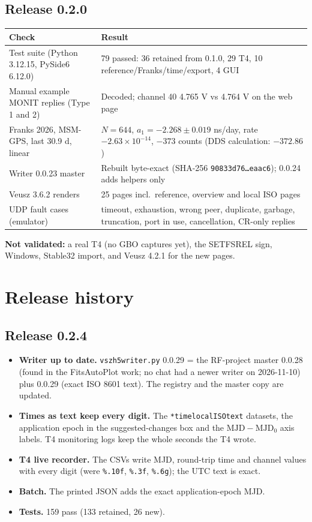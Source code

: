 \documentclass[11pt,a4paper]{article}
\renewcommand{\_}{\usscore\allowbreak}
\newenvironment{ctable}[1]{\par\begin{center}\begin{minipage}{\linewidth}\centering\small\captionof{table}{#1}}
 {\end{minipage}\end{center}}
\begin{document}
\subsection{Release 0.2.0}
\begin{ctable}{Validation of release 0.2.0\label{tab:val020}}
\begin{tabular}{@{}P{.42\linewidth}P{.5\linewidth}@{}}
\toprule
Check & Result\\
\midrule
Test suite (Python 3.12.15, PySide6 6.12.0) & 79 passed: 36 retained from 0.1.0, 29 T4, 10 reference/Franks/time/export, 4 GUI\\
Manual example MONIT replies (Type 1 and 2) & Decoded; channel 40 4.765 V vs 4.764 V on the web page\\
Franks 2026, MSM-GPS, last 30.9 d, linear & $N=644$, $a_1=-2.268\pm0.019$ ns/day, rate $-2.63\times10^{-14}$, $-373$ counts (DDS calculation: $-372.86$)\\
Writer 0.0.23 master & Rebuilt byte-exact (SHA-256 \texttt{90833d76\dots eaac6}); 0.0.24 adds helpers only\\
Veusz 3.6.2 renders & 25 pages incl.\ reference, overview and local ISO pages\\
UDP fault cases (emulator) & timeout, exhaustion, wrong peer, duplicate, garbage, truncation, port in use, cancellation, CR-only replies\\
\bottomrule
\end{tabular}
\end{ctable}
\textbf{Not validated:} a real T4 (no GBO captures yet), the SETFSREL sign, Windows, Stable32
import, and Veusz 4.2.1 for the new pages.
\clearpage

\section{Release history}
\subsection{Release 0.2.4}
\begin{itemize}
\item \textbf{Writer up to date.} \texttt{vszh5\_writer.py} 0.0.29 = the RF-project master 0.0.28
(found in the FitsAutoPlot work; no chat had a newer writer on 2026-11-10) plus 0.0.29 (exact
ISO 8601 text). The registry and the master copy are updated.
\item \textbf{Times as text keep every digit.} The \texttt{*\_time\_local\_ISO\_text} datasets, the
application epoch in the suggested-changes box and the \(\mathrm{MJD}-\mathrm{MJD}_0\) axis labels.
T4 monitoring logs keep the whole seconds the T4 wrote.
\item \textbf{T4 live recorder.} The CSVs write MJD, round-trip time and channel values with every
digit (were \texttt{\%.10f}, \texttt{\%.3f}, \texttt{\%.6g}); the UTC text is exact.
\item \textbf{Batch.} The printed JSON adds the exact application-epoch MJD.
\item \textbf{Tests.} 159 pass (133 retained, 26 new).
\end{itemize}
\end{document}
